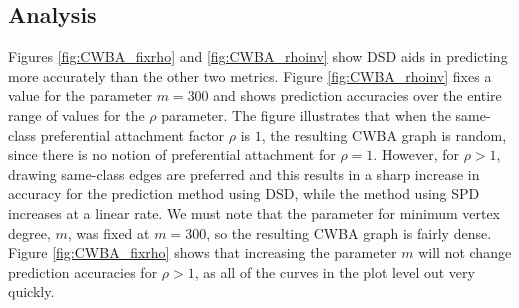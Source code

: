 \subsection{Analysis}
Figures \ref{fig:CWBA_fixrho} and \ref{fig:CWBA_rhoinv} show DSD aids in
predicting more accurately than the other two metrics. Figure 
\ref{fig:CWBA_rhoinv} fixes a value for the parameter $m = 300$ and shows
prediction accuracies over the entire range of values for the $\rho$
parameter. The figure illustrates that when the same-class preferential
attachment factor $\rho$ is $1$, the resulting CWBA graph is random, since
there is no notion of preferential attachment for $\rho=1$. However, for
$\rho > 1$, drawing same-class edges are preferred and this results in a
sharp increase in accuracy for the prediction method using DSD, while the
method using SPD increases at a linear rate. We must note that the 
parameter for minimum vertex degree, $m$, was fixed at $m=300$, so the
resulting CWBA graph is fairly dense. Figure \ref{fig:CWBA_fixrho} shows 
that increasing the parameter $m$ will not change prediction accuracies for
$\rho > 1$, as all of the curves in the plot level out very quickly.